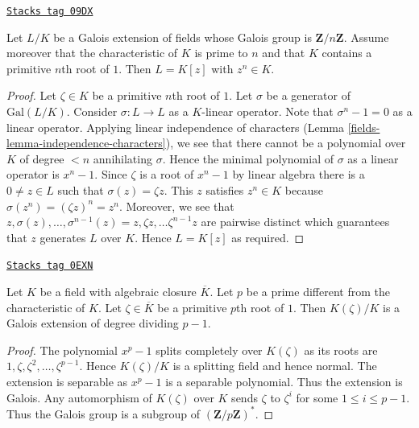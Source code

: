 \begin{lemma}

\label{fields-lemma-Kummer}
\href{https://stacks.math.columbia.edu/tag/09DX}{\texttt{Stacks tag 09DX}}

Let $L/K$ be a Galois extension of fields whose Galois group is
$\mathbf{Z}/n\mathbf{Z}$. Assume moreover that the characteristic of $K$
is prime to $n$ and that $K$ contains a primitive $n$th root of $1$.
Then $L = K[z]$ with $z^n \in K$.
\end{lemma}

\begin{proof}

Let $\zeta \in K$ be a primitive $n$th root of $1$.
Let $\sigma$ be a generator of $\text{Gal}(L/K)$.
Consider $\sigma : L \to L$ as a $K$-linear operator.
Note that $\sigma^n - 1 = 0$ as a linear operator.
Applying linear independence of characters
(Lemma \ref{fields-lemma-independence-characters}), we see
that there cannot be a polynomial over $K$ of degree $< n$
annihilating $\sigma$. Hence the minimal polynomial of $\sigma$
as a linear operator is $x^n - 1$.
Since $\zeta$ is a root of $x^n - 1$ by linear algebra
there is a $0 \neq z \in L$ such that $\sigma(z) = \zeta z$.
This $z$ satisfies $z^n \in K$ because
$\sigma(z^n) = (\zeta z)^n = z^n$. Moreover, we see that
$z, \sigma(z), \ldots, \sigma^{n - 1}(z) =
z, \zeta z, \ldots \zeta^{n - 1} z$ are pairwise distinct
which guarantees that $z$ generates $L$ over $K$.
Hence $L = K[z]$ as required.
\end{proof}

\begin{lemma}
\label{fields-lemma-adjoint-pth-root-unity}
\href{https://stacks.math.columbia.edu/tag/0EXN}{\texttt{Stacks tag 0EXN}}

Let $K$ be a field with algebraic closure $\overline{K}$.
Let $p$ be a prime different from the characteristic of $K$.
Let $\zeta \in \overline{K}$ be a primitive $p$th root
of $1$. Then $K(\zeta)/K$ is a Galois extension of degree dividing $p - 1$.
\end{lemma}

\begin{proof}
The polynomial $x^p - 1$ splits completely over
$K(\zeta)$ as its roots are $1, \zeta, \zeta^2, \ldots, \zeta^{p - 1}$.
Hence $K(\zeta)/K$ is a splitting field and hence normal.
The extension is separable as $x^p - 1$ is a separable polynomial.
Thus the extension is Galois. Any automorphism of $K(\zeta)$ over $K$
sends $\zeta$ to $\zeta^i$ for some $1 \leq i \leq p - 1$.
Thus the Galois group is a subgroup of $(\mathbf{Z}/p\mathbf{Z})^*$.
\end{proof}

